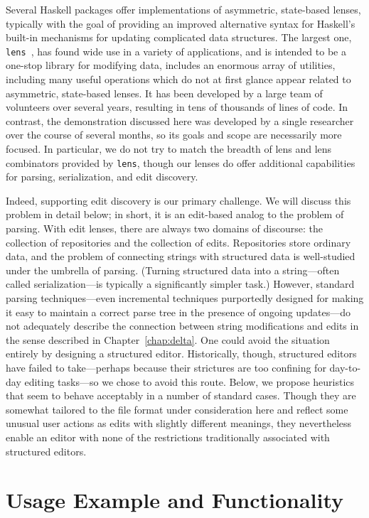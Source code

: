 Several Haskell packages offer implementations of asymmetric, state-based
lenses, typically with the goal of providing an improved alternative syntax
for Haskell's built-in mechanisms for updating complicated data structures.
The largest one, \texttt{lens}~\cite{lens-package}, has found wide use in a
variety of applications, and is intended to be a one-stop library for
modifying data, includes an enormous array of utilities, including many
useful operations which do not at first glance appear related to asymmetric,
state-based lenses. It has been developed by a large team of volunteers over
several years, resulting in tens of thousands of lines of code. In contrast,
the demonstration discussed here was developed by a single researcher over
the course of several months, so its goals and scope are necessarily more
focused. In particular, we do not try to match the breadth of lens and lens
combinators provided by \texttt{lens}, though our lenses do offer additional
capabilities for parsing, serialization, and edit discovery.

Indeed, supporting edit discovery is our primary challenge. We will discuss
this problem in detail below; in short, it is an edit-based analog
to the problem of parsing. With edit lenses, there are always two domains of
discourse: the collection of repositories and the collection of edits.
Repositories store ordinary data, and the problem of connecting strings with
structured data is well-studied under the umbrella of parsing. (Turning
structured data into a string---often called serialization---is typically a
significantly simpler task.) However, standard parsing techniques---even
incremental techniques purportedly designed for making it easy to maintain a
correct parse tree in the presence of ongoing updates---do not adequately
describe the connection between string modifications and edits in the sense
described in Chapter~\ref{chap:delta}. One could avoid the situation
entirely by designing a structured editor. Historically, though, structured
editors have failed to take---perhaps because their strictures are too
confining for day-to-day editing tasks---so we chose to avoid this route.
Below, we propose heuristics that seem to behave acceptably in a number of
standard cases. Though they are somewhat tailored to the file format under
consideration here and reflect some unusual user actions as edits with
slightly different meanings, they nevertheless enable an editor with none of
the restrictions traditionally associated with structured editors.

\section{Usage Example and Functionality}
\label{sec:impl-usage}

